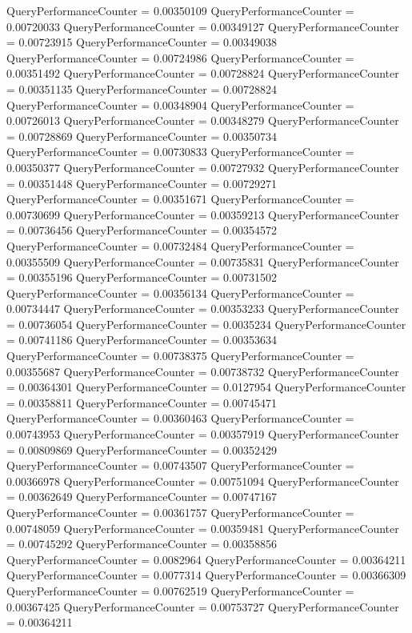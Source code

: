 \documentclass[9pt]{article}
\theoremstyle{plain}
\theoremstyle{definition}
\theoremstyle{remark}
\numberwithin{equation}{section}
\begin{document}
QueryPerformanceCounter  =  0.00350109
QueryPerformanceCounter  =  0.00720033
QueryPerformanceCounter  =  0.00349127
QueryPerformanceCounter  =  0.00723915
QueryPerformanceCounter  =  0.00349038
QueryPerformanceCounter  =  0.00724986
QueryPerformanceCounter  =  0.00351492
QueryPerformanceCounter  =  0.00728824
QueryPerformanceCounter  =  0.00351135
QueryPerformanceCounter  =  0.00728824
QueryPerformanceCounter  =  0.00348904
QueryPerformanceCounter  =  0.00726013
QueryPerformanceCounter  =  0.00348279
QueryPerformanceCounter  =  0.00728869
QueryPerformanceCounter  =  0.00350734
QueryPerformanceCounter  =  0.00730833
QueryPerformanceCounter  =  0.00350377
QueryPerformanceCounter  =  0.00727932
QueryPerformanceCounter  =  0.00351448
QueryPerformanceCounter  =  0.00729271
QueryPerformanceCounter  =  0.00351671
QueryPerformanceCounter  =  0.00730699
QueryPerformanceCounter  =  0.00359213
QueryPerformanceCounter  =  0.00736456
QueryPerformanceCounter  =  0.00354572
QueryPerformanceCounter  =  0.00732484
QueryPerformanceCounter  =  0.00355509
QueryPerformanceCounter  =  0.00735831
QueryPerformanceCounter  =  0.00355196
QueryPerformanceCounter  =  0.00731502
QueryPerformanceCounter  =  0.00356134
QueryPerformanceCounter  =  0.00734447
QueryPerformanceCounter  =  0.00353233
QueryPerformanceCounter  =  0.00736054
QueryPerformanceCounter  =  0.0035234
QueryPerformanceCounter  =  0.00741186
QueryPerformanceCounter  =  0.00353634
QueryPerformanceCounter  =  0.00738375
QueryPerformanceCounter  =  0.00355687
QueryPerformanceCounter  =  0.00738732
QueryPerformanceCounter  =  0.00364301
QueryPerformanceCounter  =  0.0127954
QueryPerformanceCounter  =  0.00358811
QueryPerformanceCounter  =  0.00745471
QueryPerformanceCounter  =  0.00360463
QueryPerformanceCounter  =  0.00743953
QueryPerformanceCounter  =  0.00357919
QueryPerformanceCounter  =  0.00809869
QueryPerformanceCounter  =  0.00352429
QueryPerformanceCounter  =  0.00743507
QueryPerformanceCounter  =  0.00366978
QueryPerformanceCounter  =  0.00751094
QueryPerformanceCounter  =  0.00362649
QueryPerformanceCounter  =  0.00747167
QueryPerformanceCounter  =  0.00361757
QueryPerformanceCounter  =  0.00748059
QueryPerformanceCounter  =  0.00359481
QueryPerformanceCounter  =  0.00745292
QueryPerformanceCounter  =  0.00358856
QueryPerformanceCounter  =  0.0082964
QueryPerformanceCounter  =  0.00364211
QueryPerformanceCounter  =  0.0077314
QueryPerformanceCounter  =  0.00366309
QueryPerformanceCounter  =  0.00762519
QueryPerformanceCounter  =  0.00367425
QueryPerformanceCounter  =  0.00753727
QueryPerformanceCounter  =  0.00364211
\end{document}
